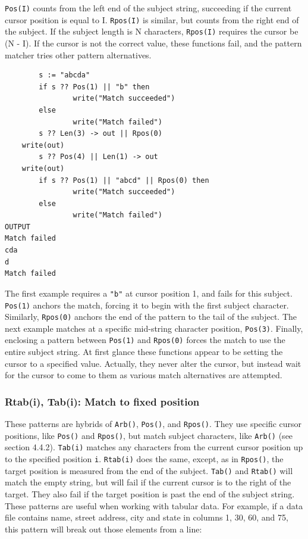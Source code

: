 \documentclass[letterpaper,12pt]{article}
\begin{document}

{\tt Pos(I)} counts from the left end of the subject string, succeeding if
the current cursor position is equal to I. {\tt Rpos(I)} is similar, but
counts from the right end of the subject. If the subject length is N
characters, {\tt Rpos(I)} requires the cursor be (N - I). If the cursor is
not the correct value, these functions fail, and the pattern matcher
tries other pattern alternatives.

\begin{verbatim}
        s := "abcda"
        if s ?? Pos(1) || "b" then
                write("Match succeeded")
        else
                write("Match failed")
        s ?? Len(3) -> out || Rpos(0) 
	write(out)
        s ?? Pos(4) || Len(1) -> out
	write(out)
        if s ?? Pos(1) || "abcd" || Rpos(0) then
                write("Match succeeded")
        else
                write("Match failed")
OUTPUT
Match failed
cda
d
Match failed
\end{verbatim}

The first example requires a {\tt "b"} at cursor position 1, and fails for
this subject. {\tt Pos(1)} anchors the match, forcing it to begin with the
first subject character. Similarly, {\tt Rpos(0)} anchors the end of the
pattern to the tail of the subject. The next example matches at a
specific mid-string character position, {\tt Pos(3)}. Finally, enclosing a
pattern between {\tt Pos(1)} and {\tt Rpos(0)} forces the match to use the
entire subject string.  At first glance these functions appear to be
setting the cursor to a specified value. Actually, they never alter
the cursor, but instead wait for the cursor to come to them as various
match alternatives are attempted.

\subsubsection{Rtab(i), Tab(i): Match to fixed position}

These patterns are hybrids of {\tt Arb()}, {\tt Pos()}, and {\tt Rpos()}.
They use specific cursor positions, like {\tt Pos()} and {\tt Rpos()},
but match subject characters, like {\tt Arb()} (see section 4.4.2).
{\tt Tab(i)} matches any characters from the
current cursor position up to the specified position {\tt i}. {\tt Rtab(i)}
does the same, except, as in {\tt Rpos()}, the target position is measured
from the end of the subject.  {\tt Tab()} and {\tt Rtab()} will match the
empty string, but
will fail if the current cursor is to the right of the target. They
also fail if the target position is past the end of the subject
string.  These patterns are useful when working with tabular data. For
example, if a data file contains name, street address, city and state
in columns 1, 30, 60, and 75, this pattern will break out those
elements from a line:
\end{document}
